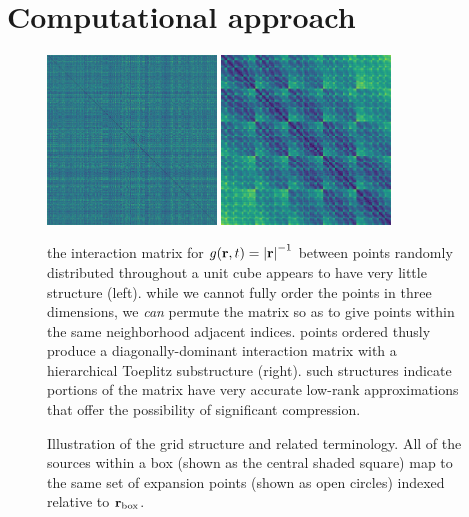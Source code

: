 \section{Computational approach}

\begin{figure}
  \centering
  \ifmakeplots
    \includegraphics[width=0.4\textwidth]{figures/dist_mat_unsorted}
    \hspace{1cm}
    \includegraphics[width=0.4\textwidth]{figures/dist_mat_sorted}
  \fi
  \caption{\label{fig:matrix structure} the interaction matrix for $g(\vb{r}, t) = \abs{\vb{r}}^{-1}$ between points randomly distributed throughout a unit cube appears to have very little structure (left).
    while we cannot fully order the points in three dimensions, we \emph{can} permute the matrix so as to give points within the same neighborhood adjacent indices.
    points ordered thusly produce a diagonally-dominant interaction matrix with a hierarchical Toeplitz substructure (right).
    such structures indicate portions of the matrix have very accurate low-rank approximations that offer the possibility of significant compression.
  }
\end{figure}

\begin{figure}
  \centering
  \caption{\label{fig:aim terminology} Illustration of the grid structure and related terminology.
    All of the sources within a box (shown as the central shaded square) map to the same set of expansion points (shown as open circles) indexed relative to $\vb{r}_\text{box}$.
  }
\end{figure}

